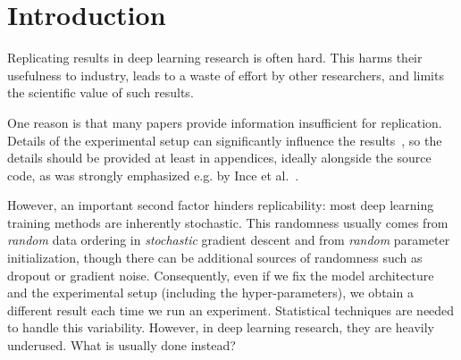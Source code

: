 \documentclass{article}
\newcommand{\dl}{deep learning\xspace}
\begin{document}

\section{Introduction}

%

Replicating results in \dl research is often hard. This harms their usefulness to industry, leads to a waste of effort by other researchers, and limits the scientific value of such results. 

One reason is that many papers provide information insufficient for replication. Details of the experimental setup can significantly influence the results~\cite{henderson2017deep, fokkens2013offspring, raeder2010consequences}, so the details should be provided at least in appendices, ideally alongside the source code, as was strongly emphasized e.g. by Ince et al.~. 

However, an important second factor hinders replicability: most deep learning training methods are inherently stochastic. This randomness usually comes from \emph{random} data ordering in \emph{stochastic} gradient descent and from \emph{random} parameter initialization, though there can be additional sources of randomness such as dropout or gradient noise. Consequently, even if we fix the model architecture and the experimental setup (including the hyper-parameters), we obtain a different result each time we run an experiment. Statistical techniques are needed to handle this variability. However, in \dl research, they are heavily underused. What is usually done instead?
\end{document}
